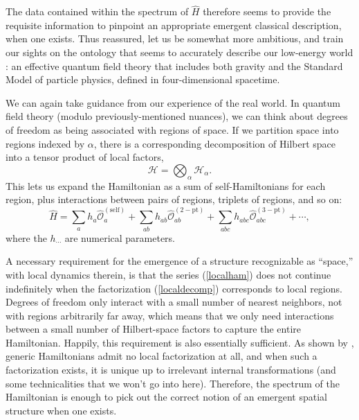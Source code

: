 \documentclass[12pt,english]{article}
\newcommand{\be}{\begin{equation}}
\newcommand{\ee}{\end{equation}}
\newcommand{\ham}{\hat{H}}
\newcommand{\HH}{\mathcal{H}}
\begin{document}
The data contained within the spectrum of $\ham$ therefore seems to provide the requisite information to pinpoint an appropriate emergent classical description, when one exists.
Thus reassured, let us be somewhat more ambitious, and train our sights on the ontology that seems to accurately describe our low-energy world \citep{Carroll:2021yum}: an effective quantum field theory that includes both gravity and the Standard Model of particle physics, defined in four-dimensional spacetime.

We can again take guidance from our experience of the real world.
In quantum field theory (modulo previously-mentioned nuances), we can think about degrees of freedom as being associated with regions of space.
If we partition space into regions indexed by $\alpha$, there is a corresponding decomposition of Hilbert space into a tensor product of local factors,
\be
  \HH = \bigotimes_\alpha \HH_\alpha.
  \label{localdecomp}
\ee
This lets us expand the Hamiltonian as a sum of self-Hamiltonians for each region, plus interactions between pairs of regions, triplets of regions, and so on:
\be
  \hat{H} = \sum_a h_a\hat{\mathcal{O}}_a^{\mathrm{(self)}} + \sum_{ab} h_{ab}\hat{\mathcal{O}}_{ab}^{\mathrm{(2-pt)}} + \sum_{abc} h_{abc}\hat{\mathcal{O}}_{abc}^{\mathrm{(3-pt)}} + \cdots,
  \label{localham}
\ee
where the $h_{\cdots}$ are numerical parameters.

A necessary requirement for the emergence of a structure recognizable as ``space,'' with local dynamics therein, is that the series (\ref{localham}) does not continue indefinitely when the factorization (\ref{localdecomp}) corresponds to local regions.
Degrees of freedom only interact with a small number of nearest neighbors, not with regions arbitrarily far away, which means that we only need interactions between a small number of Hilbert-space factors to capture the entire Hamiltonian.
Happily, this requirement is also essentially sufficient.
As shown by \citet{Cotler:2017abq}, generic Hamiltonians admit no local factorization at all, and when such a factorization exists, it is unique up to irrelevant internal transformations (and some technicalities that we won't go into here).
Therefore, the spectrum of the Hamiltonian is enough to pick out the correct notion of an emergent spatial structure when one exists.
\end{document}
